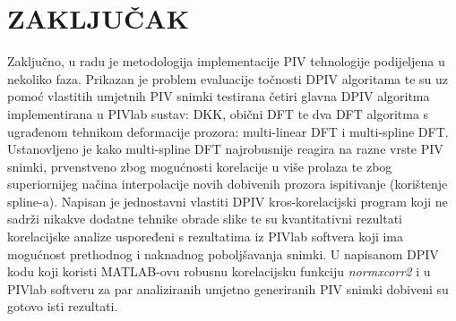 \chapter{ZAKLJUČAK}
\label{chap:Poglavlje8}
Zaključno, u radu je metodologija implementacije PIV tehnologije podijeljena u nekoliko faza. Prikazan je problem evaluacije točnosti DPIV algoritama te su uz pomoć vlastitih umjetnih PIV snimki testirana četiri glavna DPIV algoritma implementirana u PIVlab sustav: DKK, obični DFT te dva DFT algoritma s ugrađenom tehnikom deformacije prozora: multi-linear DFT i multi-spline DFT. Ustanovljeno je kako multi-spline DFT najrobusnije reagira na razne vrste PIV snimki, prvenstveno zbog mogućnosti korelacije u više prolaza te zbog superiornijeg načina interpolacije novih dobivenih prozora ispitivanje (korištenje spline-a). Napisan je jednostavni vlastiti DPIV kros-korelacijski program koji ne sadrži nikakve dodatne tehnike obrade slike te su kvantitativni rezultati korelacijske analize uspoređeni s rezultatima iz PIVlab softvera koji ima mogućnost prethodnog i naknadnog poboljšavanja snimki. U napisanom DPIV kodu koji koristi MATLAB-ovu robusnu korelacijsku funkciju \textit{normxcorr2} i u PIVlab softveru za par analiziranih umjetno generiranih PIV snimki dobiveni su gotovo isti rezultati.
\par
